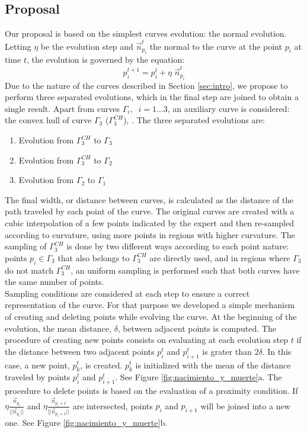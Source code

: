 \documentclass{article}
\begin{document}
\subsection{Proposal}
\label{ssec:proposal}
Our proposal is based on the simplest curves evolution: the normal evolution. Letting $\eta$ be the evolution step and $\vec{n}_{p_i}^t$ the normal to the curve at the point $p_i$ at time $t$, the evolution is governed by the equation:
\begin{equation}
  p_i^{t+1}=p_i^t+\eta \; \vec{n}_{p_i}^t
  \label{ec:normal}
\end{equation}
Due to the nature of the curves described in Section \ref{sec:intro}, we propose to perform three separated evolutions, which in the final step are joined to obtain a single result. Apart from curves $\Gamma_i,\;\; i=1\dots3$, an auxiliary curve is considered: the convex hull of curve $\Gamma_3$ ($\Gamma_3^{CH}$), \cite{libro}. The three separated evolutions are:
\begin{enumerate}
  \item Evolution from $\Gamma_3^{CH}$ to $\Gamma_3$
  \item Evolution from $\Gamma_3^{CH}$ to $\Gamma_2$
  \item Evolution from $\Gamma_2$ to $\Gamma_1$
\end{enumerate}
The final width, or distance between curves, is calculated as the distance of the path traveled by each point of the curve. The original curves are created with a cubic interpolation of a few points indicated by the expert and then re-sampled according to curvature, using more points in regions with higher curvature. The sampling of $\Gamma_3^{CH}$ is done by two different ways according to each point nature: points $p_i\in\Gamma_{3}$ that also belongs to $\Gamma_3^{CH}$ are directly used, and in regions where $\Gamma_3$ do not match $\Gamma_3^{CH}$, an uniform sampling is performed such that both curves have the same number of points.\\
Sampling conditions are considered at each step to ensure a correct representation of the curve. For that purpose we developed a simple mechanism of creating and deleting points while evolving the curve. At the beginning of the evolution, the mean distance, $\delta$, between adjacent points is computed. The procedure of creating new points consists on evaluating at each evolution step $t$ if the distance between two adjacent points $p_i^t$ and $p_{i+1}^t$ is grater than $2\delta$. In this case, a new point, $p_k^t$, is created. $p_k^t$ is initialized with the mean of the distance traveled by points $p_i^t$ and $p_{i+1}^t$. See Figure \ref{fig:nacimiento_y_muerte}a. The procedure to delete points is based on the evaluation of a proximity condition. If $\eta\frac{\vec{n}_{p_i}}{||\vec{n}_{p_i}||}$ and $\eta\frac{\vec{n}_{p_i+1}}{||\vec{n}_{p_i+1}||}$ are intersected, points $p_i$ and $p_{i+1}$ will be joined into a new one. See Figure \ref{fig:nacimiento_y_muerte}b.
\end{document}
